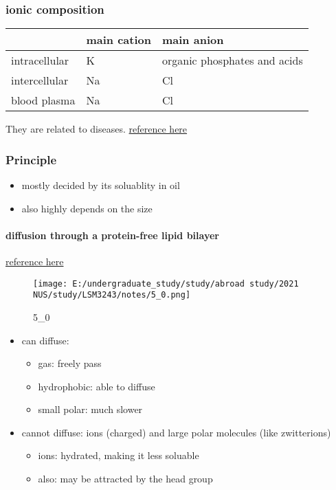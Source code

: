 \documentclass[]{article}
\let\oldparagraph\paragraph
\renewcommand{\paragraph}[1]{\oldparagraph{#1}\mbox{}}
\begin{document}
\hypertarget{ionic-composition}{%
\subsubsection{ionic composition}\label{ionic-composition}}

\begin{longtable}[]{@{}lll@{}}
\toprule
& main cation & main anion\tabularnewline
\midrule
\endhead
intracellular & K & organic phosphates and acids\tabularnewline
intercellular & Na & Cl\tabularnewline
blood plasma & Na & Cl\tabularnewline
\bottomrule
\end{longtable}

They are related to diseases.
\href{http://book.bionumbers.org/what-are-the-concentrations-of-different-ions-in-cells}{reference
here}

\hypertarget{principle-1}{%
\subsubsection{Principle }\label{principle-1}}

\begin{itemize}
\item
  mostly decided by its soluablity in oil
\item
  also highly depends on the size
\end{itemize}

\hypertarget{diffusion-through-a-protein-free-lipid-bilayer}{%
\paragraph{diffusion through a protein-free lipid
bilayer}\label{diffusion-through-a-protein-free-lipid-bilayer}}

\href{https://www.ncbi.nlm.nih.gov/books/NBK26815/}{reference here}

\begin{figure}
\centering
\texttt{[image: E:/undergraduate\_study/study/abroad study/2021 NUS/study/LSM3243/notes/5\_0.png]}
\caption{5\_0}
\end{figure}

\begin{itemize}
\item
  can diffuse:

  \begin{itemize}
  \item
    gas: freely pass
  \item
    hydrophobic: able to diffuse
  \item
    small polar: much slower
  \end{itemize}
\item
  cannot diffuse: ions (charged) and large polar molecules (like
  zwitterions)

  \begin{itemize}
  \item
    ions: hydrated, making it less soluable
  \item
    also: may be attracted by the head group
  \end{itemize}
\end{itemize}
\end{document}

